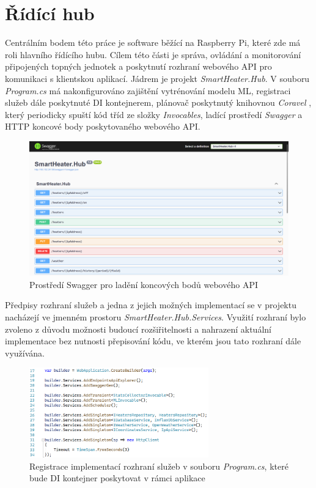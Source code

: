 \pagebreak

\section{Řídící hub}
Centrálním bodem této práce je software běžící na Raspberry Pi, které zde má roli hlavního řídícího hubu. Cílem této části je správa, ovládání a monitorování připojených topných jednotek a poskytnutí rozhraní webového API pro komunikaci s klientskou aplikací. Jádrem je projekt {\it SmartHeater.Hub}. V souboru {\it Program.cs} má nakonfigurováno zajištění vytrénování modelu ML, registraci služeb dále poskytnuté DI kontejnerem, plánovač poskytnutý knihovnou {\it Coravel} \cite{coravel}, který periodicky spuští kód tříd ze složky {\it Invocables}, ladící prostředí {\it Swagger} a HTTP koncové body poskytovaného webového API.

\begin{figure}[hbt]
\includegraphics[width=\textwidth]{obrazky-figures/swagger.png}
\caption{Prostředí Swagger pro ladění koncových bodů webového API}
\end{figure}

Předpisy rozhraní služeb a jedna z jejich možných implementací se v projektu nacházejí ve jmenném prostoru {\it SmartHeater.Hub.Services}. Využití rozhraní bylo zvoleno z důvodu možnosti budoucí rozšiřitelnosti a nahrazení aktuální implementace bez nutnosti přepisování kódu, ve kterém jsou tato rozhraní dále využívána.

\begin{figure}[hbt]
\includegraphics[width=0.69\textwidth]{obrazky-figures/code-hubservices.png}
\caption{Registrace implementací rozhraní služeb v souboru {\it Program.cs}, které bude DI kontejner poskytovat v rámci aplikace}
\end{figure}

